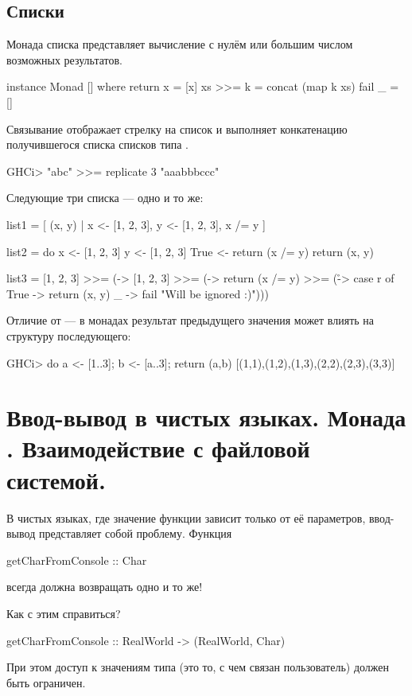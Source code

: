 \documentclass[11pt,a4paper]{article}
\begin{document}
\subsection{Списки}
Монада списка представляет вычисление с нулём или большим
числом возможных результатов.
\begin{hscode}
instance Monad [] where
	return x = [x]
	xs >>= k = concat (map k xs)
	fail _ = []
\end{hscode}
Связывание \hs{(>>=)} отображает стрелку  на список  и выполняет конкатенацию получившегося списка списков типа \hs{[[b]]}.
\begin{hscode}
GHCi> "abc" >>= replicate 3
"aaabbbccc"
\end{hscode}
Следующие три списка --- одно и то же:
\begin{hscode}
list1 = [ (x, y) | x <- [1, 2, 3], y <- [1, 2, 3], x /= y ]

list2 = do
	x <- [1, 2, 3]
	y <- [1, 2, 3]
	True <- return (x /= y)
	return (x, y)

list3 = 
	[1, 2, 3] >>= (\x ->
	[1, 2, 3] >>= (\y ->
	return (x /= y) >>= (\r ->
	case r of 
		True -> return (x, y)
		_ -> fail "Will be ignored :)")))
\end{hscode}
Отличие  от  --- в монадах результат предыдущего значения может влиять на структуру последующего:
\begin{hscode}
GHCi> do {a <- [1..3]; b <- [a..3]; return (a,b)}
[(1,1),(1,2),(1,3),(2,2),(2,3),(3,3)]
\end{hscode}


\section{Ввод-вывод в чистых языках. Монада . Взаимодействие с файловой системой.}
В чистых языках, где значение функции зависит только от её
параметров, ввод-вывод представляет собой проблему.
Функция
\begin{hscode}
getCharFromConsole :: Char
\end{hscode}
всегда должна возвращать одно и то же!

Как с этим справиться?
\begin{hscode}
getCharFromConsole :: RealWorld -> (RealWorld, Char)
\end{hscode}
При этом доступ к значениям типа  (это то, с чем связан пользователь) должен быть
ограничен.
\end{document}
